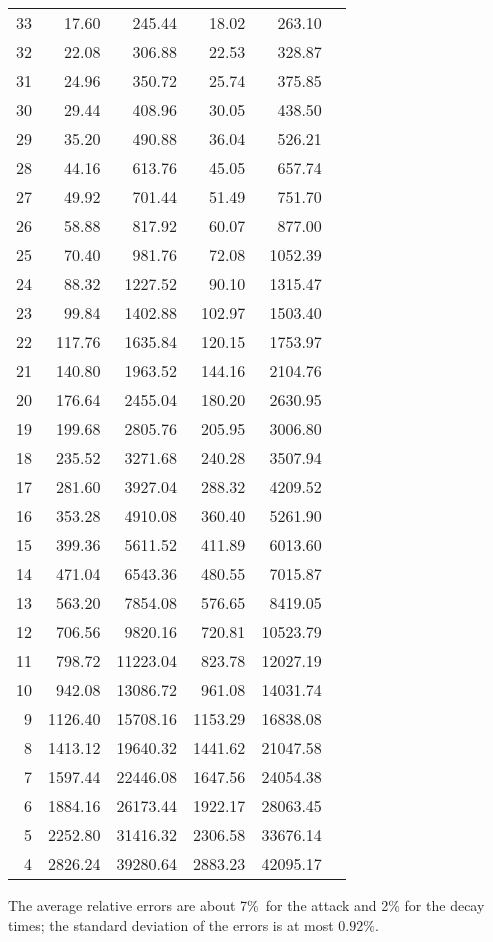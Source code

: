 \documentclass[english]{scrartcl}
\begin{document}
\begin{center}
\begin{tabular}{rrrrrr}
33 & 17.60 & 245.44 & 18.02 & 263.10 \\
32 & 22.08 & 306.88 & 22.53 & 328.87 \\
31 & 24.96 & 350.72 & 25.74 & 375.85 \\
30 & 29.44 & 408.96 & 30.05 & 438.50 \\
29 & 35.20 & 490.88 & 36.04 & 526.21 \\
28 & 44.16 & 613.76 & 45.05 & 657.74 \\
27 & 49.92 & 701.44 & 51.49 & 751.70 \\
26 & 58.88 & 817.92 & 60.07 & 877.00 \\
25 & 70.40 & 981.76 & 72.08 & 1052.39 \\
24 & 88.32 & 1227.52 & 90.10 & 1315.47 \\
23 & 99.84 & 1402.88 & 102.97 & 1503.40 \\
22 & 117.76 & 1635.84 & 120.15 & 1753.97 \\
21 & 140.80 & 1963.52 & 144.16 & 2104.76 \\
20 & 176.64 & 2455.04 & 180.20 & 2630.95 \\
19 & 199.68 & 2805.76 & 205.95 & 3006.80 \\
18 & 235.52 & 3271.68 & 240.28 & 3507.94 \\
17 & 281.60 & 3927.04 & 288.32 & 4209.52 \\
16 & 353.28 & 4910.08 & 360.40 & 5261.90 \\
15 & 399.36 & 5611.52 & 411.89 & 6013.60 \\
14 & 471.04 & 6543.36 & 480.55 & 7015.87 \\
13 & 563.20 & 7854.08 & 576.65 & 8419.05 \\
12 & 706.56 & 9820.16 & 720.81 & 10523.79 \\
11 & 798.72 & 11223.04 & 823.78 & 12027.19 \\
10 & 942.08 & 13086.72 & 961.08 & 14031.74 \\
9 & 1126.40 & 15708.16 & 1153.29 & 16838.08 \\
8 & 1413.12 & 19640.32 & 1441.62 & 21047.58 \\
7 & 1597.44 & 22446.08 & 1647.56 & 24054.38 \\
6 & 1884.16 & 26173.44 & 1922.17 & 28063.45 \\
5 & 2252.80 & 31416.32 & 2306.58 & 33676.14 \\
4 & 2826.24 & 39280.64 & 2883.23 & 42095.17
\end{tabular}

\flushleft
The average relative errors are about 7\%~for the attack and 2\% for the decay times; the standard deviation of the errors is at most $0.92\%$.

\end{center}
\end{document}
